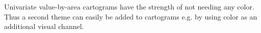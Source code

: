 Univariate value-by-area cartograms have the strength of not needing any color. Thus a second theme can easily be added to cartograms e.g. by using color as an additional visual channel.